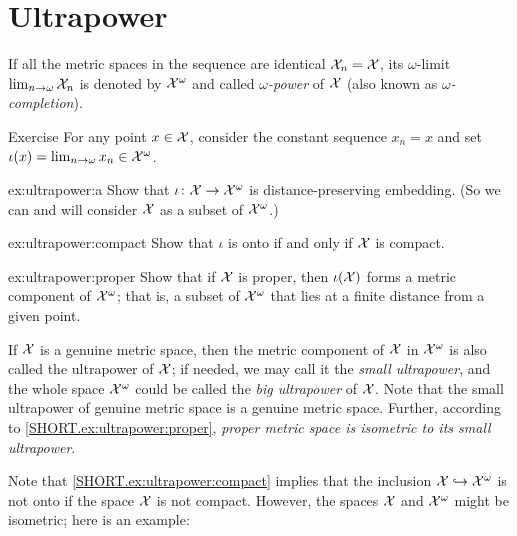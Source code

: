 \section{Ultrapower}

If all the metric spaces in the sequence are identical $\mathcal{X}_n=\mathcal{X}$, 
its $\omega$-limit 
$\lim_{n\to\omega}\mathcal{X}_n$
is denoted by $\mathcal{X}^\omega$
and called \emph{$\omega$-power} of $\mathcal{X}$ (also known as \emph{$\omega$-completion}).



\begin{thm}{Exercise}\label{ex:ultrapower}
For any point $x\in \mathcal{X}$, consider the constant sequence $x_n=x$
and set $\iota(x)=\lim_{n\to\omega}x_n\in\mathcal{X}^\omega$.

\begin{subthm}{ex:ultrapower:a}
Show that $\iota\colon\mathcal{X}\to\mathcal{X}^\omega$ is distance-preserving embedding. (So we can and will consider $\mathcal{X}$ as a subset of $\mathcal{X}^\omega$.)
\end{subthm}

\begin{subthm}{ex:ultrapower:compact} 
Show that $\iota$ is onto if and only if $\mathcal{X}$ is compact.
\end{subthm}

\begin{subthm}{ex:ultrapower:proper} 
Show that if $\mathcal{X}$ is proper, then $\iota(\mathcal{X})$ forms a metric component of $\mathcal{X}^\omega$; that is, a subset of $\mathcal{X}^\omega$ that lies at a finite distance from a given point.
\end{subthm}

\end{thm}

If $\mathcal{X}$ is a genuine metric space, then the metric component of $\mathcal{X}$ in $\mathcal{X}^\omega$ is also called the ultrapower of $\mathcal{X}$;
if needed, we may call it the \emph{small ultrapower}, and the whole space $\mathcal{X}^\omega$ could be called the \emph{big ultrapower} of $\mathcal{X}$.
Note that the small ultrapower of genuine metric space is a genuine metric space.
Further, according to \ref{SHORT.ex:ultrapower:proper}, \textit{proper metric space is isometric to its small ultrapower}.

Note that \ref{SHORT.ex:ultrapower:compact} implies that the inclusion $\mathcal{X}\hookrightarrow\mathcal{X}^\omega$ is not onto if the space $\mathcal{X}$ is not compact.
However, the spaces $\mathcal{X}$ and $\mathcal{X}^\omega$ might be isometric; here is an example:

